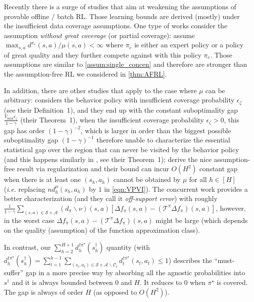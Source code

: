 Recently there is a surge of studies that aim at weakening the assumptions of provable offline / batch RL. Those learning bounds are derived (mostly) under the insufficient data coverage assumptions. One type of works consider the assumption \emph{without great coverage} (or partial coverage): \cite{chang2021mitigating,uehara2021pessimistic} assume $\max_{s,a}d^{\pi_e}(s,a)/\mu(s,a)<\infty$ where $\pi_e$ is either an expert policy or a policy of great quality and they further compete against with this policy $\pi_e$. Those assumptions are similar to \ref{assum:single_concen} and therefore are stronger than the assumption-free RL we considered in \ref{thm:AFRL}.
  

In addition, there are other studies that apply to the case where $\mu$ can be arbitrary: \cite{liu2020provably} considers the behavior policy with insufficient coverage probability $\epsilon_\zeta$ (see their Definition~1), and they end up with the constant suboptimality gap $\frac{V_{\max}\epsilon_\zeta}{1-\gamma}$ (their Theorem~1), when the insufficient coverage probability $\epsilon_\zeta>0$, this gap has order $(1-\gamma)^{-2}$, which is larger in order than the biggest possible suboptimality gap $(1-\gamma)^{-1}$ therefore unable to characterize the essential statistical gap over the region that can never be visited by the behavior policy (and this happens similarly in \cite{kidambi2020morel}, see their Theorem~1); \cite{jin2020pessimism} derive the nice assumption-free result via regularization and their bound can incur $O(H^2)$ constant gap when there is at least one $(s_h,a_h)$ cannot be obtained by $\mu$ for all $h\in[H]$ (\emph{i.e.} replacing $nd^\mu_h(s_h,a_h)$ by $1$ in \eqref{eqn:VPVI}). The concurrent work \cite{xie2021bellman} provides a better characterization (and they call it \emph{off-support error}) with roughly $\frac{1}{1-\gamma}  \sum_{(s, a) \in \mathcal{S} \times \mathcal{A}}\left(d_{\pi} \backslash \nu\right)(s, a)\left[\Delta f_{\pi}(s, a)-\left(\mathcal{T}^{\pi} \Delta f_{\pi}\right)(s, a)\right]$, however, in the worst case $\Delta f_{\pi}(s, a)-\left(\mathcal{T}^{\pi} \Delta f_{\pi}\right)(s, a)$ might be large (which depends on the quality (assumption) of the function approximation class). 

In contrast, our $\sum_{h=2}^{H+1}d^{\dagger\pi^\star}_h(s^\dagger_h)$ quantity (with $d^{\dagger\pi^\star}_h(s^\dagger_h)=\sum_{t=1}^{h-1}\sum_{(s_t,a_t)\in\mathcal{S}\times\mathcal{A}\backslash\mathcal{C}_t}d^{\dagger\pi^\star}_t(s_t,a_t)\leq 1$) describes the ``must-suffer'' gap in a more precise way by absorbing all the agnostic probabilities into $s^\dagger$ and it is always bounded between $0$ and $H$. It reduces to $0$ when $\pi^\star$ is covered. The gap is always of order $H$ (as opposed to $O(H^2)$).


